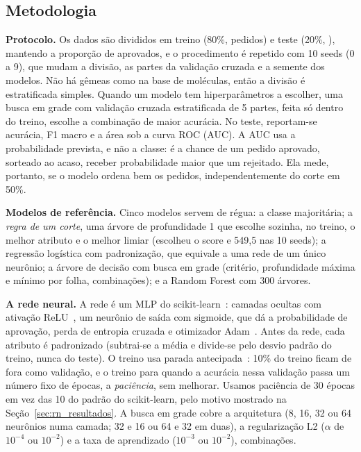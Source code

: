 \subsection{Metodologia}\label{sec:rn_metodo}

\textbf{Protocolo.} Os dados são divididos em treino (80\%, \rnTreino{} pedidos) e teste (20\%, \rnTeste), mantendo a proporção de aprovados, e o procedimento é repetido com 10 seeds (0 a 9), que mudam a divisão, as partes da validação cruzada e a semente dos modelos. Não há gêmeas como na base de moléculas, então a divisão é estratificada simples. Quando um modelo tem hiperparâmetros a escolher, uma busca em grade com validação cruzada estratificada de 5 partes, feita só dentro do treino, escolhe a combinação de maior acurácia. No teste, reportam-se acurácia, F1 macro e a área sob a curva ROC (AUC). A AUC usa a probabilidade prevista, e não a classe: é a chance de um pedido aprovado, sorteado ao acaso, receber probabilidade maior que um rejeitado. Ela mede, portanto, se o modelo ordena bem os pedidos, independentemente do corte em 50\%.

\textbf{Modelos de referência.} Cinco modelos servem de régua: a classe majoritária; a \emph{regra de um corte}, uma árvore de profundidade 1 que escolhe sozinha, no treino, o melhor atributo e o melhor limiar (escolheu o score e 549,5 nas 10 seeds); a regressão logística com padronização, que equivale a uma rede de um único neurônio; a árvore de decisão com busca em grade (critério, profundidade máxima e mínimo por folha, \rnCombinacoesArv{} combinações); e a Random Forest com 300 árvores.

\textbf{A rede neural.} A rede é um MLP do scikit-learn~\cite{pedregosa:11}: camadas ocultas com ativação ReLU~\cite{nair:10}, um neurônio de saída com sigmoide, que dá a probabilidade de aprovação, perda de entropia cruzada e otimizador Adam~\cite{kingma:15}. Antes da rede, cada atributo é padronizado (subtrai-se a média e divide-se pelo desvio padrão do treino, nunca do teste). O treino usa parada antecipada~\cite{prechelt:98}: 10\% do treino ficam de fora como validação, e o treino para quando a acurácia nessa validação passa um número fixo de épocas, a \emph{paciência}, sem melhorar. Usamos paciência de 30 épocas em vez das 10 do padrão do scikit-learn, pelo motivo mostrado na Seção~\ref{sec:rn_resultados}. A busca em grade cobre a arquitetura (8, 16, 32 ou 64 neurônios numa camada; 32 e 16 ou 64 e 32 em duas), a regularização L2 ($\alpha$ de $10^{-4}$ ou $10^{-2}$) e a taxa de aprendizado ($10^{-3}$ ou $10^{-2}$), \rnCombinacoes{} combinações.

